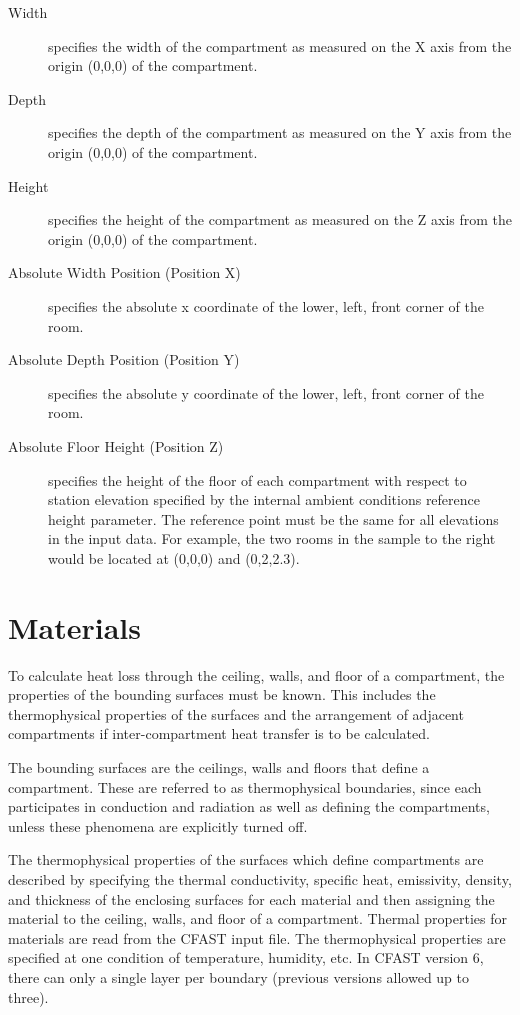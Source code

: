 \label{Compartment_Inputs}
\begin{description}
\item[Width] specifies the width of the compartment as measured on the X axis from the origin (0,0,0) of the compartment.

\item[Depth] specifies the depth of the compartment as measured on the Y axis from the origin (0,0,0) of the compartment.

\item[Height] specifies the height of the compartment as measured on the Z axis from the origin (0,0,0) of the compartment.

\item[Absolute Width Position (Position X)] specifies the absolute x coordinate of the lower, left, front corner of the room.

\item[Absolute Depth Position (Position Y)] specifies the absolute y coordinate of the lower, left, front corner of the room.

\item[Absolute Floor Height (Position Z)] specifies the height of the floor of each compartment with respect to station elevation specified by the internal ambient conditions reference height parameter.  The reference point must be the same for all elevations in the input data.  For example, the two rooms in the sample to the right would be located at (0,0,0) and (0,2,2.3).
\end{description}

\section{Materials}

To calculate heat loss through the ceiling, walls, and floor of a compartment, the properties of the bounding surfaces must be known. This includes the thermophysical properties of the surfaces and the arrangement of adjacent compartments if inter-compartment heat transfer is to be calculated.

The bounding surfaces are the ceilings, walls and floors that define a compartment. These are referred to as thermophysical boundaries, since each participates in conduction and radiation as well as defining the compartments, unless these phenomena are explicitly turned off.

The thermophysical properties of the surfaces which define compartments are described by specifying the thermal conductivity, specific heat, emissivity, density, and thickness of the enclosing surfaces for each material and then assigning the material to the ceiling, walls, and floor of a compartment.  Thermal properties for materials are read from the CFAST input file.  The thermophysical properties are specified at one condition of temperature, humidity, etc.  In CFAST version 6, there can only a single layer per boundary (previous versions allowed up to three).

